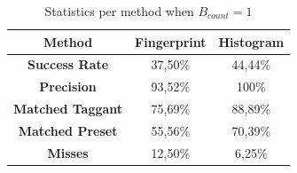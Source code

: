 \documentclass[thesis.tex]{subfiles}
\begin{document}
\begin{table}[h]
  \caption{Statistics per method when $B_{count} = 1$}

  \begin{center}
  \begin{tabular}{| c | c | c |}
    \hline
    \textbf{Method} & Fingerprint & Histogram \\
    \hline
    \textbf{Success Rate} & 37,50\% & 44,44\% \\
    \hline
    \textbf{Precision} & 93,52\% & 100\% \\
    \hline
    \textbf{Matched Taggant} & 75,69\% & 88,89\% \\
    \hline
    \textbf{Matched Preset} & 55,56\% & 70,39\% \\
    \hline
    \textbf{Misses} & 12,50\% & 6,25\% \\
    \hline
  \end{tabular}
  \end{center}
\end{table}
\end{document}
